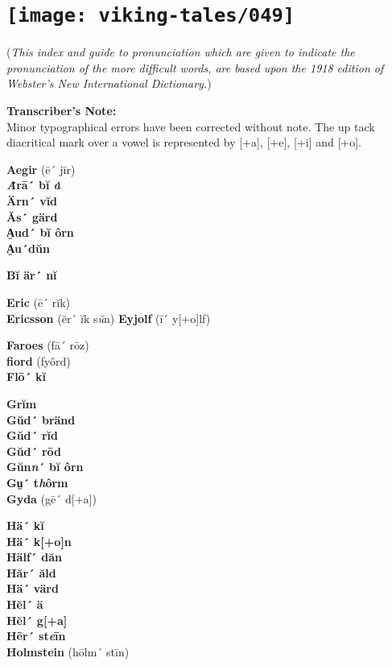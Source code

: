 \section[A Pronouncing Index]{
    \texttt{[image: viking-tales/049]}}

(\emph{This index and guide to pronunciation which are given to indicate
the pronunciation of the more difficult words, are based upon the 1918
edition of Webster's New International Dictionary.})

\noindent\textbf{Transcriber's Note:}\\
Minor typographical errors have been corrected without note. The up tack
diacritical mark over a vowel is represented by [+a], [+e], [+i] and
[+o].

\begin{multicols}{3}
\noindent\textbf{Aegir} (ē´ jĭr)\\
\textbf{\emph{Ȧ}rā´ bĭ \emph{ȧ}}\\
\textbf{Ärn´ vĭd}\\
\textbf{Ăs´ gärd}\\
\textbf{A̤ud´ bĭ ôrn}\\
\textbf{A̤u´dŭn}

\noindent\textbf{Bĭ är´ nĭ}

\noindent\textbf{Eric} (ē´ rĭk)\\
\textbf{Ericsson} (ĕr´ ĭk s\emph{ŭ}n)
\textbf{Eyjolf} (ī´ y{[}+o{]}lf)

\noindent\textbf{Faroes} (fā´ rōz)\\
\textbf{fiord} (fyôrd)\\
\textbf{Flō´ kĭ}

\noindent\textbf{Grĭm}\\
\textbf{Gŭd´ bränd}\\
\textbf{Gŭd´ rĭd}\\
\textbf{Gŭd´ rōd}\\
\textbf{Gŭn\emph{n}´ bĭ ôrn}\\
\textbf{Gṳ´ t\emph{h}ôrm}\\
\textbf{Gyda} (gē´ d{[}+a{]})

\noindent\textbf{Hä´ kĭ}\\
\textbf{Hä´ k{[}+o{]}n}\\
\textbf{Hälf´ dăn}\\
\textbf{Hăr´ ăld}\\
\textbf{Hä´ värd}\\
\textbf{Hĕl´ ä}\\
\textbf{Hĕl´ g{[}+a{]}}\\
\textbf{Hẽr´ st\emph{e}īn}\\
\textbf{Holmstein} (hōlm´ stīn)


\end{multicols}
